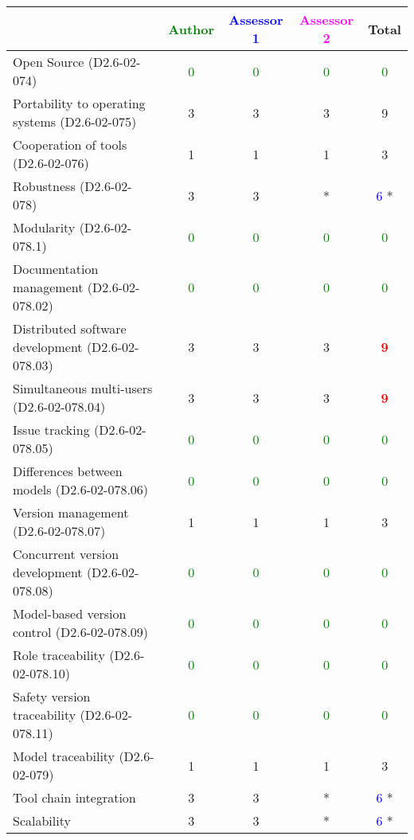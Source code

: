 \begin{tabular}{|l | c | c | c | c|}
\hline
& \textcolor{green}{Author} & \textcolor{blue}{Assessor 1} & \textcolor{magenta}{Assessor 2} & Total \\
\hline 
Open Source (D2.6-02-074) & \textcolor{green}{0}   & \textcolor{green}{0}   & \textcolor{green}{0} & \textcolor{green}{0}  \\
\hline 
Portability to operating systems (D2.6-02-075) &3 &3 & 3    &  9 \\
\hline
Cooperation of tools (D2.6-02-076) &1 &1 & 1    & 3     \\
\hline
Robustness (D2.6-02-078) &3 &3 & *& \textcolor{blue}{6} * \\
\hline
Modularity (D2.6-02-078.1) & \textcolor{green}{0}   & \textcolor{green}{0}   & \textcolor{green}{0} & \textcolor{green}{0} \\
\hline
Documentation management (D2.6-02-078.02) & \textcolor{green}{0}   & \textcolor{green}{0}   & \textcolor{green}{0} & \textcolor{green}{0} \\
\hline
Distributed software development (D2.6-02-078.03)  &3 &3 & 3    & \textcolor{red}{\textbf{9}} \\
\hline
Simultaneous multi-users (D2.6-02-078.04)   &3 &3 & 3    & \textcolor{red}{\textbf{9}} \\
\hline
Issue tracking (D2.6-02-078.05) & \textcolor{green}{0}   & \textcolor{green}{0}   & \textcolor{green}{0} & \textcolor{green}{0} \\
\hline
Differences between models (D2.6-02-078.06) & \textcolor{green}{0}   & \textcolor{green}{0}   & \textcolor{green}{0} & \textcolor{green}{0} \\
\hline
Version management (D2.6-02-078.07) &1 &1 & 1    & 3     \\
\hline
Concurrent version development (D2.6-02-078.08) & \textcolor{green}{0}   & \textcolor{green}{0}   & \textcolor{green}{0} & \textcolor{green}{0} \\
\hline
Model-based version control (D2.6-02-078.09) & \textcolor{green}{0}   & \textcolor{green}{0}   & \textcolor{green}{0} & \textcolor{green}{0} \\
\hline
Role traceability (D2.6-02-078.10) & \textcolor{green}{0}   & \textcolor{green}{0}   & \textcolor{green}{0} & \textcolor{green}{0} \\
\hline
Safety version traceability (D2.6-02-078.11) & \textcolor{green}{0}   & \textcolor{green}{0}   & \textcolor{green}{0} & \textcolor{green}{0} \\
\hline
Model traceability (D2.6-02-079) &1 &1 & 1    & 3     \\
\hline
Tool chain integration &3 &3 & *& \textcolor{blue}{6} * \\
\hline
Scalability &3 &3 & * & \textcolor{blue}{6} *\\
\hline
\end{tabular}

